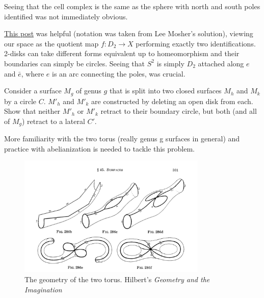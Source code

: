 \documentclass[10pt]{article}
\begin{document}
Seeing that the cell complex is the same as the sphere with north and south
poles identified was not immediately obvious.

\href{https://math.stackexchange.com/questions/1194611/cw-complex-structure-on-standard-sphere-identifying-the-south-pole-and-north-pol}{This
post} was helpful (notation was taken from Lee Mosher's solution), viewing our
space as the quotient map $f: D_2 \to X$ performing exactly two
identifications. 2-disks can take different forms equivalent up to
homeomorphism and their boundaries can simply be circles. Seeing that $S^2$ is
simply $D_2$ attached along $e$ and $\bar{e}$, where $e$ is an arc connecting
the poles, was crucial.


\begin{exercise}[1.2.8]

Consider a surface $M_g$ of genus $g$ that is split into two closed surfaces
$M_h$ and $M_k$ by a circle $C$. $M'_h$ and $M'_k$ are constructed by deleting an open disk
from each. Show that neither $M'_h$ or $M'_k$ retract to
their boundary circle, but both (and all of $M_g$) retract to a lateral $C'$.


\end{exercise}

More familiarity with the two torus (really genus g surfaces in general) and
practice with abelianization is needed to tackle this problem.

\begin{figure}[ht!]
\centering
\includegraphics[width=90mm]{two-torus-hilbert.png}
\caption{The geometry of the two torus. Hilbert's \textit{Geometry and the Imagination} \label{overflow}}
\end{figure}
\end{document}
